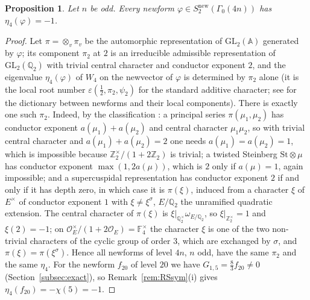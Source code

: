 ﻿\documentclass[11pt]{amsart}
\newtheorem{proposition}[theorem]{Proposition}
\theoremstyle{remark}
\newcommand{\Z}{\mathbb{Z}}
\newcommand{\e}{\varepsilon}
\begin{document}
\begin{proposition}\label{prop:eta4}
Let $n$ be odd. Every newform $\varphi\in S_2^{\mathrm{new}}(\Gamma_0(4n))$ has $\eta_4(\varphi)=-1$.
\end{proposition}
\begin{proof}
Let $\pi=\otimes_v\pi_v$ be the automorphic representation of $\mathrm{GL}_2(\mathbb A)$ generated by $\varphi$; its component $\pi_2$ at $2$ is an irreducible admissible representation of $\mathrm{GL}_2(\mathbb Q_2)$ with trivial central character and conductor exponent $2$, and the eigenvalue $\eta_4(\varphi)$ of $W_4$ on the newvector of $\varphi$ is determined by $\pi_2$ alone (it is the local root number $\e(\frac12,\pi_2,\psi_2)$ for the standard additive character; see \cite[Section~2]{LW} for the dictionary between newforms and their local components). There is exactly one such $\pi_2$. Indeed, by the classification \cite[Chapters~4, 6 and 9]{BH}: a principal series $\pi(\mu_1,\mu_2)$ has conductor exponent $a(\mu_1)+a(\mu_2)$ and central character $\mu_1\mu_2$, so with trivial central character and $a(\mu_1)+a(\mu_2)=2$ one needs $a(\mu_1)=a(\mu_2)=1$, which is impossible because $\Z_2^\times/(1+2\Z_2)$ is trivial; a twisted Steinberg $\mathrm{St}\otimes\mu$ has conductor exponent $\max(1,2a(\mu))$, which is $2$ only if $a(\mu)=1$, again impossible; and a supercuspidal representation has conductor exponent $2$ if and only if it has depth zero, in which case it is $\pi(\xi)$, induced from a character $\xi$ of $E^\times$ of conductor exponent $1$ with $\xi\ne\xi^\sigma$, $E/\mathbb Q_2$ the unramified quadratic extension. The central character of $\pi(\xi)$ is $\xi|_{\mathbb Q_2^\times}\omega_{E/\mathbb Q_2}$, so $\xi|_{\Z_2^\times}=1$ and $\xi(2)=-1$; on $\mathcal O_E^\times/(1+2\mathcal O_E)=\mathbb F_4^\times$ the character $\xi$ is one of the two non-trivial characters of the cyclic group of order $3$, which are exchanged by $\sigma$, and $\pi(\xi)=\pi(\xi^\sigma)$. Hence all newforms of level $4n$, $n$ odd, have the same $\pi_2$ and the same $\eta_4$. For the newform $f_{20}$ of level $20$ we have $G_{1,5}=\frac83f_{20}\ne0$ (Section~\ref{subsec:exact}), so Remark~\ref{rem:RSsym}(i) gives $\eta_4(f_{20})=-\chi(5)=-1$.
\end{proof}
\end{document}
